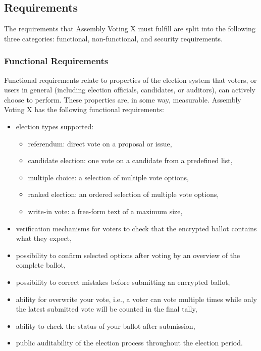 \subsection{Requirements} \label{sec: requirements}
The requirements that Assembly Voting X must fulfill are split into the following three categories: functional, non-functional, and security requirements.


\subsubsection{Functional Requirements} \label{sec: functional requirements}
Functional requirements relate to properties of the election system that voters, or users in general (including election officials, candidates, or auditors), can actively choose to perform. These properties are, in some way, measurable. Assembly Voting X has the following functional requirements:

\begin{itemize}
    \item election types supported:
    \begin{itemize}
        \item referendum: direct vote on a proposal or issue,
        \item candidate election: one vote on a candidate from a predefined list,
        \item multiple choice: a selection of multiple vote options,
        \item ranked election: an ordered selection of multiple vote options,
        \item write-in vote: a free-form text of a maximum size,
    \end{itemize}
    \item verification mechanisms for voters to check that the encrypted ballot contains what they expect,
    \item possibility to confirm selected options after voting by an overview of the complete ballot,
    \item possibility to correct mistakes before submitting an encrypted ballot,
    \item ability for overwrite your vote, i.e., a voter can vote multiple times while only the latest submitted vote will be counted in the final tally,
    \item ability to check the status of your ballot after submission,
    \item public auditability of the election process throughout the election period.
\end{itemize}


